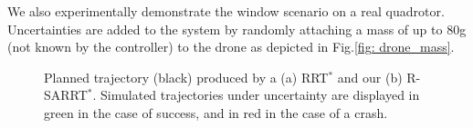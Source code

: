 We also experimentally demonstrate the window scenario on a real quadrotor.
Uncertainties are added to the system by randomly attaching a mass of up to 80g (not known by the controller) to the drone as depicted in Fig.\ref{fig: drone_mass}.



\begin{figure} [h]
    \centering
    \caption{Planned trajectory (black) produced by a (a) RRT$^*$ and our (b) R-SARRT$^*$. 
    Simulated trajectories under uncertainty are displayed in green in the case of success, and in red in the case of a crash.}%
    \label{fig: simu window}%
\end{figure}

